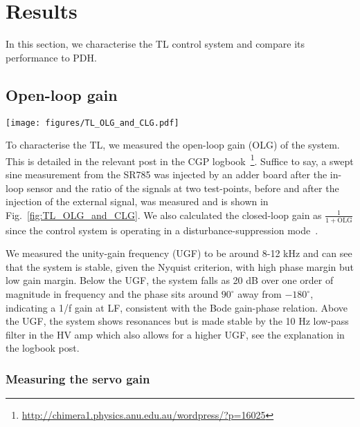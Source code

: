 \documentclass[aps,pra,superscriptaddress,reprint,nofootinbib]{revtex4-1}
\begin{document}
\section{Results}
\label{sec:results}

In this section, we characterise the TL control system and compare its performance to PDH.

\subsection{Open-loop gain}
\label{sec:OLG}

\begin{figure*}
	\texttt{[image: figures/TL\_OLG\_and\_CLG.pdf]}
	\caption{SR785 measurements from 2021-01-05 of Bode amplitude and phase for the transfer function of the TL control system (i.e.\ the OLG) with 10 mV swept sine injected after the in-loop sensor. The phase measurements are relative to $-180^\circ$.}
	\label{fig:TL_OLG_and_CLG}
\end{figure*}

To characterise the TL, we measured the open-loop gain (OLG) of the system. This is detailed in the relevant post in the CGP logbook~\footnote{\url{http://chimera1.physics.anu.edu.au/wordpress/?p=16025}}. Suffice to say, a swept sine measurement from the SR785 was injected by an adder board after the in-loop sensor and the ratio of the signals at two test-points, before and after the injection of the external signal, was measured and is shown in Fig.~\ref{fig:TL_OLG_and_CLG}. We also calculated the closed-loop gain as $\frac{1}{1+\mathrm{OLG}}$ since the control system is operating in a disturbance-suppression mode~\cite{FCS:2000}.

We measured the unity-gain frequency (UGF) to be around 8-12 kHz and can see that the system is stable, given the Nyquist criterion, with high phase margin but low gain margin. Below the UGF, the system falls as 20 dB over one order of magnitude in frequency and the phase sits around $90^\circ$ away from $-180^\circ$, indicating a 1/f gain at LF, consistent with the Bode gain-phase relation. Above the UGF, the system shows resonances but is made stable by the 10 Hz low-pass filter in the HV amp which also allows for a higher UGF, see the explanation in the logbook post.

\subsubsection{Measuring the servo gain}
\end{document}
